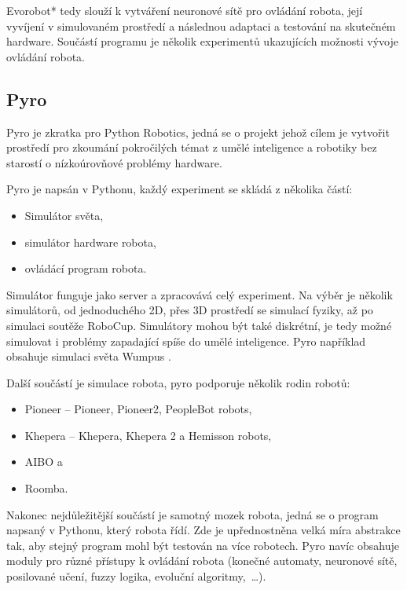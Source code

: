 \documentclass[12pt,notitlepage]{report}
\begin{document}
        Evorobot* tedy slouží k vytváření neuronové sítě pro ovládání robota,
        její vyvíjení v simulovaném prostředí a následnou adaptaci a testování
        na skutečném hardware. Součástí programu je několik experimentů
        ukazujících možnosti vývoje ovládání robota.

        \subsection{Pyro}
        \label{pyro}

        Pyro je zkratka pro Python Robotics, jedná se o projekt jehož cílem je
        vytvořit prostředí pro zkoumání pokročilých témat z umělé inteligence a
        robotiky bez starostí o nízkoúrovňové problémy hardware.

        Pyro je napsán v Pythonu, každý experiment se skládá z několika částí:
        \begin{itemize}
            \item Simulátor světa,
            \item simulátor hardware robota,
            \item ovládácí program robota.
        \end{itemize}

        Simulátor funguje jako server a zpracovává celý experiment. Na výběr je
        několik simulátorů, od jednoduchého 2D, přes 3D prostředí se simulací
        fyziky, až po simulaci soutěže RoboCup. Simulátory mohou být také
        diskrétní, je tedy možné simulovat i problémy zapadající spíše do umělé
        inteligence. Pyro například obsahuje simulaci světa Wumpus \cite{aima}.

        Další součástí je simulace robota, pyro podporuje několik
        rodin robotů:

        \begin{itemize}
            \item Pioneer -- Pioneer, Pioneer2, PeopleBot robots,
            \item Khepera -- Khepera, Khepera 2 a Hemisson robots,
            \item AIBO a
            \item Roomba.
        \end{itemize}

        Nakonec nejdůležitější součástí je samotný mozek robota, jedná se o
        program napsaný v Pythonu, který robota řídí. Zde je upřednostněna
        velká míra abstrakce tak, aby stejný program mohl být testován na více
        robotech. Pyro navíc obsahuje moduly pro různé přístupy k ovládání
        robota (konečné automaty, neuronové sítě, posilované učení, fuzzy
        logika, evoluční algoritmy,~\ldots).
\end{document}
